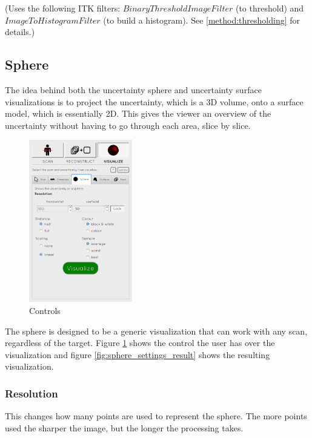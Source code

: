 (Uses the following ITK filters: $BinaryThresholdImageFilter$ (to threshold) and $ImageToHistogramFilter$ (to build a histogram). See \ref{method:thresholding} for details.)

\clearpage
\subsection{Sphere}\label{implementation:sphere}
The idea behind both the uncertainty sphere and uncertainty surface visualizations is to project the uncertainty, which is a 3D volume, onto a surface model, which is essentially 2D. This gives the viewer an overview of the uncertainty without having to go through each area, slice by slice.

\begin{figure}
  \vspace{-20pt}
  \includegraphics[width=0.4\textwidth]{images/tool/3_sphere.png}
  \caption{Controls}\label{fig:sphere_settings}
\end{figure}

The sphere is designed to be a generic visualization that can work with any scan, regardless of the target. Figure \ref{fig:sphere_settings} shows the control the user has over the visualization and figure \ref{fig:sphere_settings_result} shows the resulting visualization.

\subsubsection{Resolution}
This changes how many points are used to represent the sphere. The more points used the sharper the image, but the longer the processing takes.

